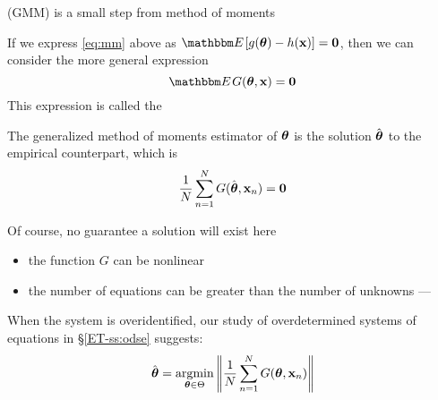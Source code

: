\begin{frame}

    \vspace{2em}
     (GMM) is a small step from method of moments
    
    If we express \eqref{eq:mm} above as $\EE[g(\boldtheta) - h(\boldx)] = \boldzero$, 
    then we can consider the more general expression
    \begin{equation}
        \label{eq:gmm}
        \EE G(\boldtheta, \boldx) = \boldzero
    \end{equation}
    This expression is called the 
    
    \vspace{.7em}
    The generalized
    method of moments estimator of ${\boldsymbol \theta}$ is the solution $\hat {{\boldsymbol \theta}}$ to the
    empirical counterpart, which is
    \begin{equation*}
        \label{eq:gmme}
        \frac{1}{N} \sum_{n=1}^N G(\hat {{\boldsymbol \theta}}, {\mathbf x}_n) = {\mathbf 0}
    \end{equation*}
    
\end{frame}

\begin{frame}

    \vspace{2em}
    Of course, no guarantee a solution will exist here
    \begin{itemize}
        \item the function $G$ can be nonlinear
        \item the number of
    equations can be greater than the number of unknowns ---  
    \end{itemize}
    
    \vspace{.7em}
    When the system is overidentified, our study of overdetermined systems of
    equations in \S\ref{ET-ss:odse}
    suggests:
    \begin{equation*}
        \label{eq:gmme2}
        \hat \boldtheta = \argmin_{\boldtheta \in \Theta} 
            \left \|
                \frac{1}{N} \sum_{n=1}^N G(\boldtheta, \boldx_n) 
            \right \|
    \end{equation*}
    
\end{frame}

